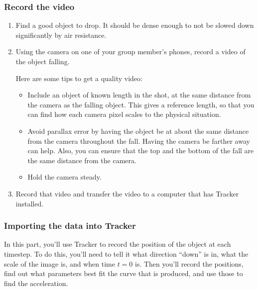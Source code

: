 \subsubsection{Record the video}

\begin{enumerate}
	\item Find a good object to drop. It should be dense enough to not be slowed down significantly by air resistance.
	
	\item Using the camera on one of your group member's phones, record a video of the object falling.
	
	Here are some tips to get a quality video:
	\begin{itemize}
		\item Include an object of known length in the shot, at the same distance from the camera as the falling object. This gives a reference length, so that you can find how each camera pixel scales to the physical situation.
		
		\item Avoid parallax error by having the object be at about the same distance from the camera throughout the fall. Having the camera be farther away can help. Also, you can ensure that the top and the bottom of the fall are the same distance from the camera.
		
		\item Hold the camera steady.
	\end{itemize}

	\item Record that video and transfer the video to a computer that has Tracker installed.
\end{enumerate}

\subsubsection{Importing the data into Tracker}

In this part, you'll use Tracker to record the position of the object at each timestep. To do this, you'll need to tell it what direction ``down'' is in, what the scale of the image is, and when time $t=0$ is. Then you'll record the positions, find out what parameters best fit the curve that is produced, and use those to find the acceleration.


